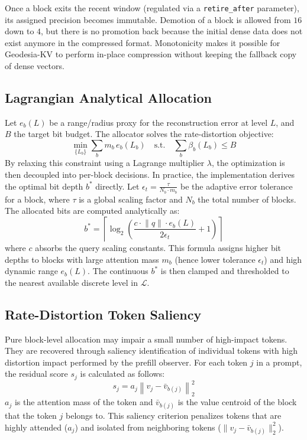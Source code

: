 \documentclass[10pt,twocolumn]{article}
\newcommand{\method}{Geodesia-KV}
\begin{document}
Once a block exits the recent window (regulated via a \texttt{retire\_after} parameter), its assigned precision becomes immutable. Demotion of a block is allowed from $16$ down to $4$, but there is no promotion back because the initial dense data does not exist anymore in the compressed format. Monotonicity makes it possible for \method{} to perform in-place compression without keeping the fallback copy of dense vectors.

\subsection{Lagrangian Analytical Allocation}

Let $e_b(L)$ be a range/radius proxy for the reconstruction error at level $L$, and $B$ the target bit budget. The allocator solves the rate-distortion objective:
\begin{equation}
\min_{\{L_b\}} \sum_b m_b \, e_b(L_b) \quad\text{s.t.}\quad \sum_b \beta_b(L_b) \le B
\label{eq:allocation}
\end{equation}
By relaxing this constraint using a Lagrange multiplier $\lambda$, the optimization is then decoupled into per-block decisions. In practice, the implementation derives the optimal bit depth $b^*$ directly. Let $\epsilon_t = \frac{\tau}{N_b \cdot m_b}$ be the adaptive error tolerance for a block, where $\tau$ is a global scaling factor and $N_b$ the total number of blocks. The allocated bits are computed analytically as:
\begin{equation}
b^* = \left\lceil \log_2\left( \frac{c \cdot \lVert q \rVert \cdot e_b(L)}{2 \epsilon_t} + 1 \right) \right\rceil
\end{equation}
where $c$ absorbs the query scaling constants. This formula assigns higher bit depths to blocks with large attention mass $m_b$ (hence lower tolerance $\epsilon_t$) and high dynamic range $e_b(L)$. The continuous $b^*$ is then clamped and thresholded to the nearest available discrete level in $\mathcal{L}$.
\subsection{Rate-Distortion Token Saliency}

Pure block-level allocation may impair a small number of high-impact tokens. They are recovered through saliency identification of individual tokens with high distortion impact performed by the prefill observer. For each token $j$ in a prompt, the residual score $s_j$ is calculated as follows:
\begin{equation}
s_j = a_j \left\lVert v_j - \bar{v}_{b(j)} \right\rVert_2^2
\label{eq:rdscore}
\end{equation}
$a_j$ is the attention mass of the token and $\bar{v}_{b(j)}$ is the value centroid of the block that the token $j$ belongs to. This saliency criterion penalizes tokens that are highly attended ($a_j$) and isolated from neighboring tokens ($\lVert v_j - \bar{v}_{b(j)} \rVert_2^2$).
\end{document}
